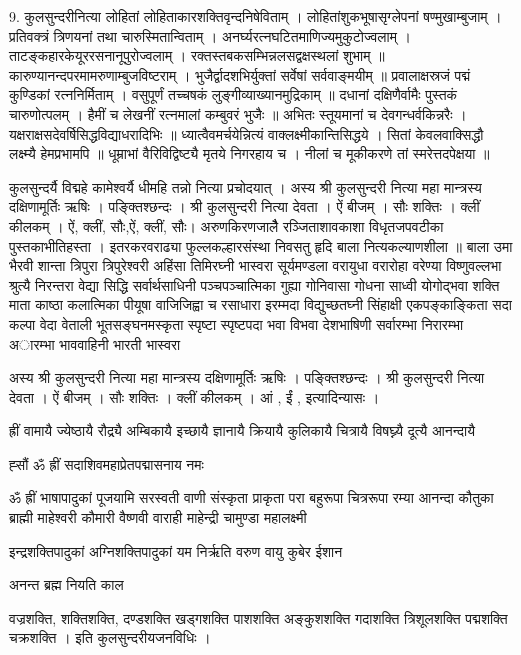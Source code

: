 9. कुलसुन्दरीनित्या
लोहितां लोहिताकारशक्तिवृन्दनिषेविताम् । लोहितांशुकभूषासृग्लेपनां षण्मुखाम्बुजाम् ।
प्रतिवक्त्रं त्रिणयनां तथा चारुस्मितान्विताम् । अनर्घ्यरत्नघटितमाणिज्यमुकुटोज्वलाम् ।
ताटङ्कहारकेयूररसनानूपुरोज्वलाम् । रक्तस्तबकसम्भिन्नलसद्वक्षस्थलां शुभाम् ॥
कारुण्यानन्दपरमामरुणाम्बुजविष्टराम् । भुजैर्द्वादशभिर्युक्तां सर्वेषां सर्ववाङ्मयीम् ॥
प्रवालाक्षस्रजं पद्मं कुण्डिकां रत्ननिर्मिताम् । वसुपूर्णं तच्चषकं लुङ्गीव्याख्यानमुद्रिकाम् ॥
दधानां दक्षिणैर्वामैः पुस्तकं चारुणोत्पलम् । हैमीं च लेखनीं रत्नमालां कम्बुवरं भुजैः ॥
अभितः स्तूयमानां च देवगन्धर्वकिन्नरैः । यक्षराक्षसदेवर्षिसिद्धविद्याधरादिभिः ॥
ध्यात्वैवमर्चयेन्नित्यं वाक्लक्ष्मीकान्तिसिद्धये । सितां केवलवाक्सिद्धौ लक्ष्म्यै हेमप्रभामपि ॥
धूम्राभां वैरिविद्विष्ट्यै मृतये निगरहाय च । नीलां च मूकीकरणे तां स्मरेत्तदपेक्षया ॥

कुलसुन्दर्यै विद्महे कामेश्वर्यै धीमहि तन्नो नित्या प्रचोदयात् । 
अस्य श्री कुलसुन्दरी नित्या महा मान्त्रस्य दक्षिणामूर्तिः ऋषिः । पङ्क्तिश्छन्दः । श्री कुलसुन्दरी नित्या देवता । ऐं बीजम् । सौः शक्तिः । क्लीं कीलकम् ।
ऐं, क्लीं, सौः,ऐं, क्लीं, सौः।
अरुणकिरणजालैै रञ्जिताशावकाशा विधृतजपवटीका पुस्तकाभीतिहस्ता ।
इतरकरवराढ्या फुल्लकल्हारसंस्था निवसतु हृदि बाला नित्यकल्याणशीला ॥
 बाला उमा भैरवी शान्ता त्रिपुरा त्रिपुरेश्वरी अहिंसा तिमिरघ्नी भास्वरा सूर्यमण्डला वरायुधा वरारोहा वरेण्या विष्णुवल्लभा श्रुत्यै निरन्तरा वेद्या सिद्धि सर्वार्थसाधिनी पञ्चपञ्चात्मिका गुह्या गोनिवासा गोधना साध्वी योगोद्भवा शक्ति माता काष्ठा कलात्मिका पीयूषा वाजिजिह्वा च रसाधारा इरम्मदा विद्युच्छतघ्नी सिंहाक्षी एकपङ्काङ्किता सदा कल्पा वेदा वेताली भूतसङ्घनमस्कृता स्पृष्टा स्पृष्टपदा भवा विभवा देशभाषिणी सर्वारम्भा निरारम्भा अारम्भा भाववाहिनी भारती भास्वरा 

अस्य श्री कुलसुन्दरी नित्या महा मान्त्रस्य दक्षिणामूर्तिः ऋषिः । पङ्क्तिश्छन्दः । श्री कुलसुन्दरी नित्या देवता । ऐं बीजम् । सौः शक्तिः । क्लीं कीलकम् ।
आं , ईं , इत्यादिन्यासः ।

ह्रीं वामायै ज्येष्ठायै रौद्र्यै अम्बिकायै इच्छायै ज्ञानायै क्रियायै कुलिकायै चित्रायै विषघ्न्यै दूत्यै आनन्दायै 

ह्सौं ॐ ह्रीं सदाशिवमहाप्रेतपद्मासनाय नमः 

ॐ ह्रीं भाषापादुकां पूजयामि
सरस्वती वाणी संस्कृता प्राकृता परा बहुरूपा चित्ररूपा रम्या 
आनन्दा कौतुका 
ब्राह्मी माहेश्वरी कौमारी वैष्णवी वाराही माहेन्द्री चामुण्डा महालक्ष्मी 

इन्द्रशक्तिपादुकां अग्निशक्तिपादुकां यम निर्ऋति वरुण वायु कुबेर ईशान 								

अनन्त ब्रह्म नियति काल 				
																		
वज्रशक्ति, शक्तिशक्ति, दण्डशक्ति खड्गशक्ति पाशशक्ति अङ्कुशशक्ति गदाशक्ति त्रिशूलशक्ति पद्मशक्ति चक्रशक्ति ।
इति कुलसुन्दरीयजनविधिः ।



